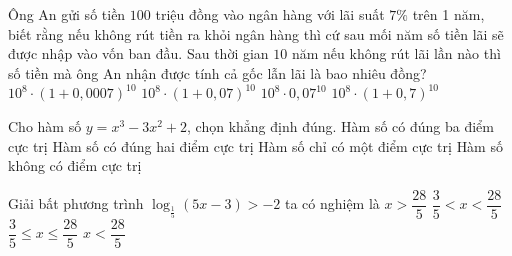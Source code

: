 \begin{ex}%
Ông An gửi số tiền $100$ triệu đồng vào ngân hàng với lãi suất $7\%$ trên 1 năm, biết rằng nếu không rút tiền ra khỏi ngân hàng thì cứ sau mối năm số tiền lãi sẽ được nhập vào vốn ban đầu. Sau thời gian $10$ năm nếu không rút lãi lần nào thì số tiền mà ông An nhận được tính cả gốc lẫn lãi là bao nhiêu đồng?
\choice
{$10^8\cdot (1+0{,}0007)^{10}$}
{\True $10^8\cdot (1+0{,}07)^{10}$}
{$10^8\cdot 0{,}07^{10}$}
{$10^8\cdot (1+0{,}7)^{10}$}
\end{ex}

\begin{ex}%
Cho hàm số $y=x^3-3x^2+2$, chọn khẳng định đúng.
\choice
{Hàm số có đúng ba điểm cực trị}
{\True Hàm số có đúng hai điểm cực trị}
{Hàm số chỉ có một điểm cực trị}
{Hàm số không có điểm cực trị}
\end{ex}

\begin{ex}%
Giải bất phương trình $\log_{\frac{1}{5}}(5x-3)>-2$ ta có nghiệm là
\choice
{$x>\dfrac{28}{5}$}
{\True $\dfrac{3}{5}<x<\dfrac{28}{5}$}
{$\dfrac{3}{5}\leq x\leq \dfrac{28}{5}$}
{$x<\dfrac{28}{5}$}
\end{ex}

